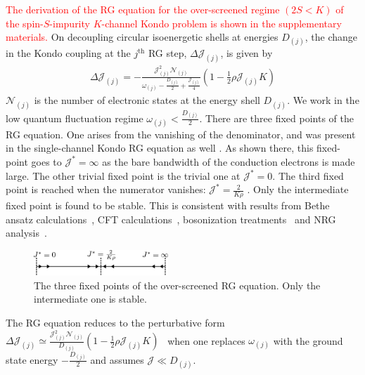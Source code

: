 \documentclass[reprint,prb,superscriptaddress]{revtex4-2}
\begin{document}
\textcolor{red}{The derivation of the RG equation for the over-screened regime \((2S < K)\) of the spin-\(S\)-impurity \(K\)-channel Kondo problem is shown in the supplementary materials.}
On decoupling circular isoenergetic shells at energies \(D_{(j)}\), the change in the Kondo coupling at the \(j^\text{th}\) RG step, \(\Delta {\mathcal{J}}_{(j)}\), is given by
\begin{equation}\begin{aligned}
	\Delta {\mathcal{J}}_{(j)} = -\frac{{\mathcal{J}}_{(j)}^2 \mathcal{N}_{(j)}}{\omega_{(j)} - \frac{D_{(j)}}{2} + \frac{{\mathcal{J}}_{(j)}}{4}}\left( 1 - \frac{1}{2}\rho {\mathcal{J}}_{(j)} K \right) 
\end{aligned}\end{equation}
\(\mathcal{N}_{(j)}\) is the number of electronic states at the energy shell \(D_{(j)}\). We work in the low quantum fluctuation regime \(\omega_{(j)} < \frac{D_{(j)}}{2}\). There are three fixed points of the RG equation. One arises from the vanishing of the denominator, and was present in the single-channel Kondo RG equation as well \cite{kondo_urg}. As shown there, this fixed-point goes to \({\mathcal{J}}^* = \infty\) as the bare bandwidth of the conduction electrons is made large. The other trivial fixed point is the trivial one at \({\mathcal{J}}^* = 0\). The third fixed point is reached when the numerator vanishes: \({\mathcal{J}}^* = \frac{2}{K \rho}\) \cite{Gan_mchannel_1994,Kogan_2018,Kuramoto1998,Noz_blandin_1980}. Only the intermediate fixed point is found to be stable. This is consistent with results from Bethe ansatz calculations~\cite{Tsvelick_Weigmann_mchannel_1984,andrei_destri_1984,zarand_costi_2002,andrei_jerez_1995,Tsvelick_1985,Tsvelick1984}, CFT calculations~\cite{affleck_1991_overscreen,affleck1993exact,affleck_ludwig_1991}, bosonization treatments~\cite{emery_kivelson,vondelft_prl_1998} and NRG analysis~\cite{pang_cox_1991,mitchell_bulla_2014}.
\begin{figure}[htpb]
	\centering
	\includegraphics[width=0.45\textwidth]{plt/rg_flow.pdf}
	\caption{The three fixed points of the over-screened RG equation. Only the intermediate one is stable.}
	\label{rg_flow}
\end{figure}

The RG equation reduces to the perturbative form \(\Delta {\mathcal{J}}_{(j)} \simeq \frac{{\mathcal{J}}_{(j)}^2 \mathcal{N}_{(j)}}{D_{(j)}}\left( 1 - \frac{1}{2}\rho {\mathcal{J}}_{(j)} K \right)\)~\cite{Kogan_2018,Kuramoto1998,Noz_blandin_1980,tripathi2018landau} when one replaces \(\omega_{(j)}\) with the ground state energy \(-\frac{D_{(j)}}{2}\) and assumes \({\mathcal{J}} \ll D_{(j)}\).
\end{document}

